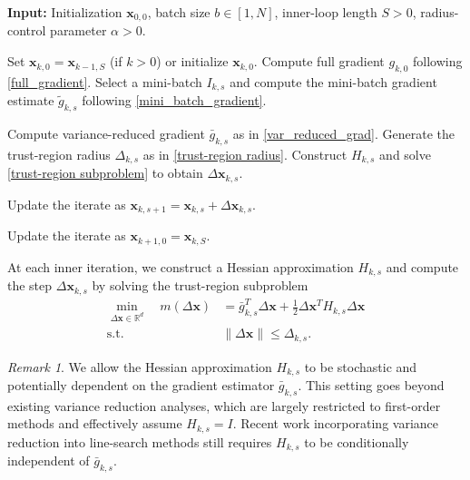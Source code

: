\documentclass{article}
\newcommand{\bx}{\boldsymbol{x}}
\newcommand{\barg}{\bar{g}}
\theoremstyle{plain}
\theoremstyle{definition}
\theoremstyle{remark}
\newtheorem{remark}[theorem]{Remark}
\begin{document}
\begin{algorithm}[t]
\caption{Trust-Region Method with Stochastic Variance Reduction (TRSVR)}
\label{algo_TR-SVR}
\begin{algorithmic}[1]
\STATE \textbf{Input:} Initialization $\bx_{0,0}$, batch size $b \in [1, N]$, inner-loop length $S > 0$, radius-control parameter $\alpha > 0$.
        
\STATE Set $\bx_{k,0} = \bx_{k-1,S}$ (if $k > 0$) or initialize $\bx_{k,0}$.
\STATE Compute full gradient $g_{k,0}$ following \eqref{full_gradient}.
\STATE Select a mini-batch $I_{k,s}$ and compute the mini-batch gradient estimate $\tilde{g}_{k,s}$ following \eqref{mini_batch_gradient}.
                
\STATE Compute variance-reduced gradient $\barg_{k,s}$ as in \eqref{var_reduced_grad}.
\STATE Generate the trust-region radius $\Delta_{k,s}$ as in \eqref{trust-region radius}.
\STATE Construct $H_{k,s}$ and solve \eqref{trust-region subproblem}
to obtain $\Delta \bx_{k,s}$.
                
\STATE Update the iterate as $\bx_{k,s+1} = \bx_{k,s} + \Delta \bx_{k,s}$.
\ENDFOR
            
\STATE Update the iterate as $\bx_{k+1,0} = \bx_{k,S}$.
\ENDFOR
\end{algorithmic}
\end{algorithm}

At each inner iteration, we construct a Hessian approximation $H_{k,s}$ and compute the step $\Delta \bx_{k,s}$ by solving the trust-region subproblem
\begin{equation}\label{trust-region subproblem}
  \begin{aligned}
    \min_{\Delta \bx \in \mathbb{R}^d} \quad
    m(\Delta \bx)
    &= \barg_{k,s}^T \Delta \bx
      + \frac{1}{2} \Delta \bx^T H_{k,s} \Delta \bx \\
    \text{s.t.} \quad
    & \|\Delta \bx\| \leq \Delta_{k,s}.
  \end{aligned}
\end{equation}
\begin{remark}
We allow the Hessian approximation $H_{k,s}$ to be stochastic and potentially dependent on the gradient estimator $\barg_{k,s}$. This setting goes beyond existing variance reduction analyses, which are largely restricted to first-order methods and effectively assume $H_{k,s}=I$. Recent work incorporating variance reduction into line-search methods \citep{Berahas2023Accelerating} still requires $H_{k,s}$ to be conditionally independent of $\barg_{k,s}$.
\end{remark}
\end{document}
